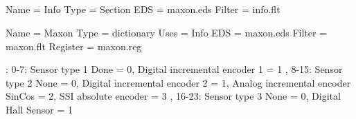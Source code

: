 \documentclass[a4paper,12pt]{article}
\begin{document}
\begin{appendices}

\renewcommand{\thesection}{\Asbuk{section}}

\makeatletter
\renewcommand{\theProgram}{\thesection.\@arabic\c@Program}
\makeatother

\section{\centering}
\setcounter{Program}{0}

\begin{flushleft}
\label{app:info-desc}
\begin{MyCodes}

Name = Info
Type = Section
EDS = maxon.eds
Filter = info.flt

\end{MyCodes}
\end{flushleft}

\begin{flushleft}
\label{app:maxon-desc}
\begin{MyCodes}

Name = Maxon
Type = dictionary
Uses = Info
EDS = maxon.eds
Filter = maxon.flt
Register = maxon.reg

\end{MyCodes}
\end{flushleft}

\begin{flushleft}
\label{app:info-flt}
\begin{MyCodes}
[1000]

\end{MyCodes}
\end{flushleft}

\begin{flushleft}
\label{app:maxon-flt}
\begin{MyCodes}
[3000]

\end{MyCodes}
\end{flushleft}

\begin{flushleft}
\label{app:maxon-reg}
\begin{MyCodes}
[3000sub1]: {
    0-7: Sensor type 1 {
        Done = 0,
        Digital incremental encoder 1 = 1
    },
    8-15: Sensor type 2 {
        None = 0,
        Digital incremental encoder 2 = 1,
        Analog incremental encoder SinCos = 2,
        SSI absolute encoder = 3
    },
    16-23: Sensor type 3 {
        None = 0,
        Digital Hall Sensor = 1
    }
}
\end{MyCodes}
\end{flushleft}


\end{appendices}
\end{document}
